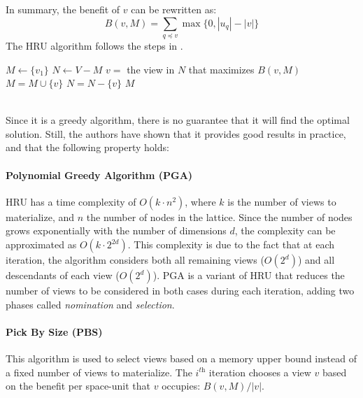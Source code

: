 In summary, the benefit of $v$ can be rewritten as:
\begin{equation*}
    B(v,M) = \sum_{q \preceq v} \max\{0, |u_q| - |v|\}
\end{equation*}
The HRU algorithm follows the steps in .
\begin{algorithm}[h]
\caption{HRU.}
\begin{algorithmic}[H]
    \State $M \gets \{v_1\}$
    \State $N \gets V - M$
        \State $v =$ the view in $N$ that maximizes $B(v,M)$
        \State $M = M \cup \{v\}$
        \State $N = N - \{v\}$
    \EndFor
    \State \Return $M$
\end{algorithmic}
\label{alg:hru}
\end{algorithm}\\
Since it is a greedy algorithm, there is no guarantee that it will find the optimal solution. Still, the authors have shown that it provides good results in practice, and that the following property holds:

\paragraph{Polynomial Greedy Algorithm (PGA)} HRU has a time complexity of $O(k \cdot n^2)$, where $k$ is the number of views to materialize, and $n$ the number of nodes in the lattice. Since the number of nodes grows exponentially with the number of dimensions $d$, the complexity can be approximated as $O(k \cdot 2^{2d})$. This complexity is due to the fact that at each iteration, the algorithm considers both all remaining views ($O(2^d)$) and all descendants of each view ($O(2^d)$). PGA is a variant of HRU that reduces the number of views to be considered in both cases during each iteration, adding two phases called \textit{nomination} and \textit{selection}. 

\paragraph{Pick By Size (PBS)} This algorithm is used to select views based on a memory upper bound instead of a fixed number of views to materialize. The $i^{\textit{th}}$ iteration chooses a view $v$ based on the benefit per space-unit that $v$ occupies: $B(v, M)/|v|$.

